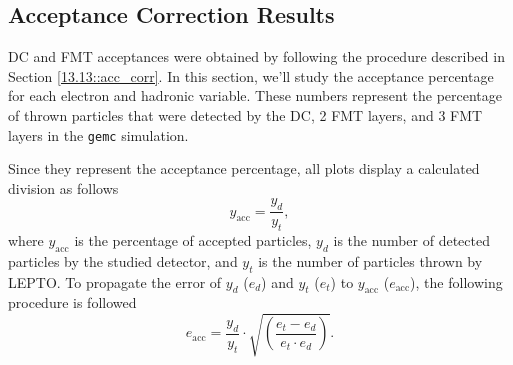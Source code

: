 \subsection{Acceptance Correction Results}
\label{14.20::acceptance_correction_results}
    DC and FMT acceptances were obtained by following the procedure described in Section \ref{13.13::acc_corr}.
    In this section, we'll study the acceptance percentage for each electron and hadronic variable.
    These numbers represent the percentage of thrown particles that were detected by the DC, 2 FMT layers, and 3 FMT layers in the \texttt{gemc} simulation.

    Since they represent the acceptance percentage, all plots display a calculated division as follows
    \begin{equation*}
        y_\text{acc} = \frac{y_d}{y_t},
    \end{equation*}
    where $y_\text{acc}$ is the percentage of accepted particles, $y_d$ is the number of detected particles by the studied detector, and $y_t$ is the number of particles thrown by LEPTO.
    To propagate the error of $y_d$ ($e_d$) and $y_t$ ($e_t$) to $y_\text{acc}$ ($e_\text{acc}$), the following procedure is followed
    \begin{equation}
        e_\text{acc} = \frac{y_d}{y_t} \cdot \sqrt{
            \left(\frac{e_t - e_d}{e_t\cdot e_d}\right)
        }.
        \label{eq::14.20::acc_error}
    \end{equation}

    
    
